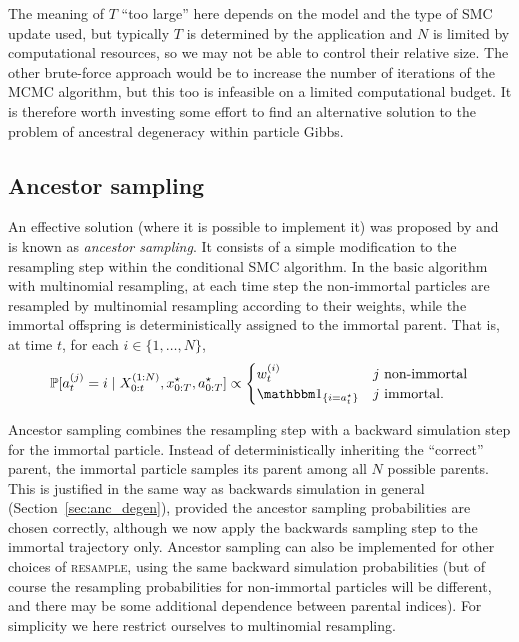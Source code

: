 The meaning of $T$ ``too large'' here depends on the model and the type of SMC update used, but typically $T$ is determined by the application and $N$ is limited by computational resources, so we may not be able to control their relative size. The other brute-force approach would be to increase the number of iterations of the MCMC algorithm, but this too is infeasible on a limited computational budget.
It is therefore worth investing some effort to find an alternative solution to the problem of ancestral degeneracy within particle Gibbs.





\subsection{Ancestor sampling}\label{sec:ancsamp}
An effective solution (where it is possible to implement it) was proposed by \textcite{whiteley2010} and is known as \emph{ancestor sampling}.
It consists of a simple modification to the resampling step within the conditional SMC algorithm. 
In the basic algorithm with multinomial resampling, at each time step the non-immortal particles are resampled by multinomial resampling according to their weights, while the immortal offspring is deterministically assigned to the immortal parent. That is, at time $t$, for each $i \in \{1,\dots, N\}$,
\begin{equation*}
\Prob[a_t^{(j)} = i \mid X_{0:t}^{(1:N)}, x_{0:T}^\star, a_{0:T}^\star ] 
\propto \begin{cases}
w_t^{(i)} & j \text{ non-immortal} \\
\I{i = a_t^\star} & j \text{ immortal} .
\end{cases}
\end{equation*}

Ancestor sampling combines the resampling step with a backward simulation step for the immortal particle. Instead of deterministically inheriting the ``correct'' parent, the immortal particle samples its parent among all $N$ possible parents.
This is justified in the same way as backwards simulation in general (Section~\ref{sec:anc_degen}), provided the ancestor sampling probabilities are chosen correctly, although we now apply the backwards sampling step to the immortal trajectory only.
Ancestor sampling can also be implemented for other choices of \textsc{resample}, using the same backward simulation probabilities (but of course the resampling probabilities for non-immortal particles will be different, and there may be some additional dependence between parental indices). For simplicity we here restrict ourselves to multinomial resampling.

